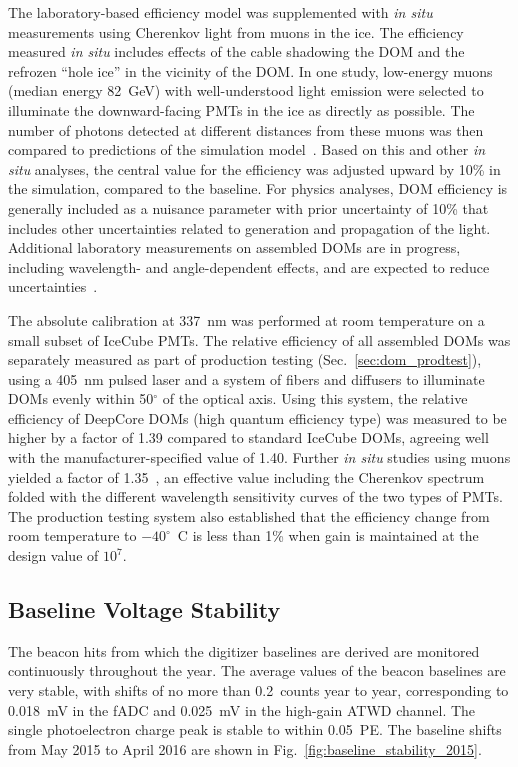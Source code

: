 The laboratory-based efficiency model was supplemented with \textit{in
  situ} measurements using Cherenkov light from muons in the ice. The
efficiency measured \textit{in situ} includes effects of the cable
shadowing the DOM and the refrozen ``hole ice'' in the vicinity of the
DOM. In one
study, low-energy muons (median energy 82~GeV) with well-understood light
emission were selected to illuminate the downward-facing PMTs in the ice as
directly as possible. The number of photons detected at different
distances from these muons was then compared to predictions of the
simulation model~\cite{IC3:ereco}.  Based on this and other \textit{in
  situ} analyses, the central value for the efficiency was adjusted upward
by 10\% in the simulation, compared to the baseline.  For physics analyses,
DOM efficiency is generally included as a nuisance parameter with prior
uncertainty of 10\% that includes other uncertainties related to
generation and propagation of the light. Additional laboratory measurements
on assembled DOMs are in progress, including wavelength- and angle-dependent
effects, and are expected to reduce uncertainties~\cite{ICECUBE:DOMEFF}.

The absolute calibration at 337~nm was performed at room temperature on a
small subset of IceCube PMTs. The relative efficiency of all assembled DOMs
was separately measured as part of production testing
(Sec.~\ref{sec:dom_prodtest}), using a 405~nm pulsed laser and a system of
fibers and diffusers to illuminate DOMs evenly within 50$^{\circ}$ of the
optical axis.  Using this system, the relative efficiency of DeepCore DOMs
(high quantum efficiency type) was measured to be higher by a factor
of 1.39
compared to standard IceCube DOMs, agreeing well with the
manufacturer-specified value of 1.40. Further \textit{in situ} studies
using muons yielded a factor of 1.35~\cite{ICECUBE:DC}, an
effective value including the Cherenkov spectrum folded with the different
wavelength sensitivity curves of the two types of PMTs.  The production
testing system also established that the efficiency change from room
temperature to $-40^{\circ}$~C is less than 1\% when gain is maintained at
the design value of $10^7$.

\subsection{\label{sec:baselines}Baseline Voltage Stability}

The beacon hits from which the digitizer baselines are derived are
monitored continuously throughout the year. The average values of the
beacon baselines are very stable, with shifts of no more than
0.2~counts year to year, corresponding to 0.018~mV in the fADC and
0.025~mV in the high-gain ATWD channel. The single photoelectron
charge peak is stable to within 0.05~PE. The baseline shifts from May
2015 to April 2016 are shown in Fig.~\ref{fig:baseline_stability_2015}. 

